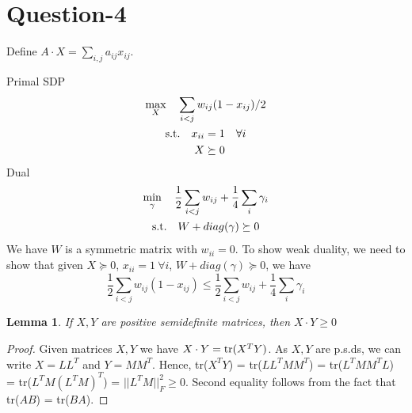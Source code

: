 \documentclass{article}
\newtheorem{lemma}[theorem]{Lemma}
\begin{document}
\section*{Question-4}
Define $A \cdot X = \sum_{i,j}a_{ij}x_{ij}$.

\noindent
Primal SDP
\begin{gather*}
    \max_{X} \quad \sum_{i < j}w_{ij}(1-x_{ij})/2 \\
    \begin{aligned}
    \textup{s.t.}\quad x_{ii} &= 1 \quad \forall i\\
    X &\succeq 0
    \end{aligned}
\end{gather*}
Dual
\begin{gather*}
    \min_{\gamma} \quad \frac{1}{2}\sum_{i < j}w_{ij} + \frac{1}{4}\sum_{i}\gamma_i\\
    \begin{aligned}
    \textup{s.t.}\quad W + diag(\gamma) \succeq 0\\
    \end{aligned}
\end{gather*}
We have $W$ is a symmetric matrix with $w_{ii} = 0$. To show weak duality, we need to show that given $X \succeq 0$, $x_{ii} = 1\ \forall i$, $W + diag(\gamma) \succeq 0$, we have
\begin{equation*}
    \frac{1}{2}\sum_{i < j}w_{ij}(1-x_{ij}) \leq \frac{1}{2}\sum_{i < j}w_{ij} + \frac{1}{4}\sum_{i}\gamma_i
\end{equation*}
\begin{lemma}
    If $X,Y$ are positive semidefinite matrices, then $X \cdot Y \ge 0$
\end{lemma}
\begin{proof}
    Given matrices $X,Y$ we have $X \cdot Y = \textup{tr}(X^TY)$. As $X,Y$ are p.s.ds, we can write $X = LL^T$ and $Y = MM^T$. Hence, tr($X^TY$) = tr($LL^TMM^T$) = tr($L^TMM^TL$) = tr($L^TM(L^TM)^T$) = $||L^TM||_{F}^2 \ge 0$. Second equality follows from the fact that tr($AB$) = tr($BA$).
\end{proof}
\end{document}
